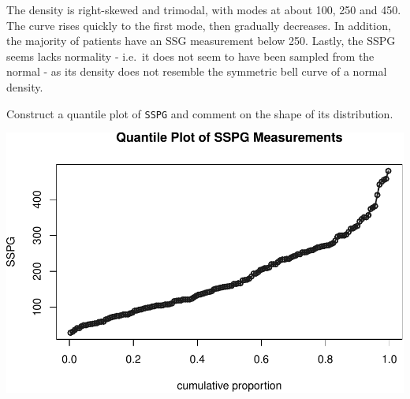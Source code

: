 \documentclass[9pt,letter]{article}
\newenvironment{Shaded}{\begin{snugshade}}{\end{snugshade}}
\newcommand{\KeywordTok}[1]{\textcolor[rgb]{0.13,0.29,0.53}{\textbf{#1}}}
\newcommand{\DataTypeTok}[1]{\textcolor[rgb]{0.13,0.29,0.53}{#1}}
\newcommand{\DecValTok}[1]{\textcolor[rgb]{0.00,0.00,0.81}{#1}}
\newcommand{\StringTok}[1]{\textcolor[rgb]{0.31,0.60,0.02}{#1}}
\newcommand{\CommentTok}[1]{\textcolor[rgb]{0.56,0.35,0.01}{\textit{#1}}}
\newcommand{\OperatorTok}[1]{\textcolor[rgb]{0.81,0.36,0.00}{\textbf{#1}}}
\newcommand{\NormalTok}[1]{#1}
\begin{document}
The density is right-skewed and trimodal, with modes at about 100, 250
and 450. The curve rises quickly to the first mode, then gradually
decreases. In addition, the majority of patients have an SSG measurement
below 250. Lastly, the SSPG seems lacks normality - i.e.~it does not
seem to have been sampled from the normal - as its density does not
resemble the symmetric bell curve of a normal density.

\item 

Construct a quantile plot of \texttt{SSPG} and comment on the shape of
its distribution.

\begin{Shaded}
\end{Shaded}

\includegraphics{a4_solutions_files/figure-latex/unnamed-chunk-3-1.pdf}
\end{document}
